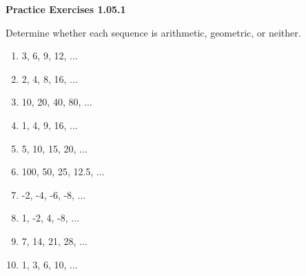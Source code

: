 \vspace{0.3ex}
\noindent\textbf{Practice Exercises 1.05.1}

\vspace{0.2ex}

Determine whether each sequence is arithmetic, geometric, or neither.
\begin{multicols}{2}
\begin{enumerate}
    \item 3, 6, 9, 12, ...
    \item 2, 4, 8, 16, ...
    \item 10, 20, 40, 80, ...
    \item 1, 4, 9, 16, ...
    \item 5, 10, 15, 20, ...
    \item 100, 50, 25, 12.5, ...
    \item -2, -4, -6, -8, ...
    \item 1, -2, 4, -8, ...
    \item 7, 14, 21, 28, ...
    \item 1, 3, 6, 10, ...
\end{enumerate}
\end{multicols}
